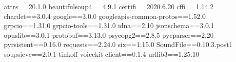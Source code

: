 attrs==20.1.0
beautifulsoup4==4.9.1
certifi==2020.6.20
cffi==1.14.2
chardet==3.0.4
google==3.0.0
googleapis-common-protos==1.52.0
grpcio==1.31.0
grpcio-tools==1.31.0
idna==2.10
jsonschema==3.0.1
opuslib==3.0.1
protobuf==3.13.0
psycopg2==2.8.5
pycparser==2.20
pyrsistent==0.16.0
requests==2.24.0
six==1.15.0
SoundFile==0.10.3.post1
soupsieve==2.0.1
tinkoff-voicekit-client==0.1.4
urllib3==1.25.10
